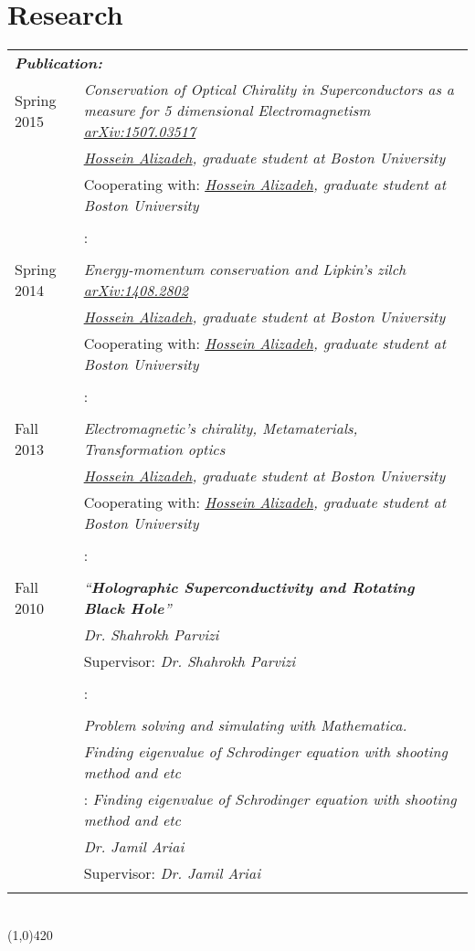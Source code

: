 \documentclass[10pt]{article}
\newcommand\HRule{\hspace*{.8cm}\line(1,0){420}\\}
\newenvironment{Record}[1]
{
    \vspace{-0.35cm}
    \section*{#1}
        \vspace{0.1cm}
        \begin{tabular}
}
{
        \end{tabular}\\
        \HRule
}
\begin{document}
\newcommand{\Research}[7]{
    \multicolumn{2}{l}{\textbf{\textsl{ #1:}}}\\
    \quad#2&\textit{#3}\\
    \ifthenelse{\isempty{#4}}
    {&\textit{#5}\\}
    {&#4: \textit{#5}\\}
    \ifthenelse{\isempty{#6}}
    {&\textit{#7}\\}
    {&#6: \textit{#7}\\}%
}

\begin{Record}{Research}{l p{11cm}}
    \Research{Publication}
        {Spring 2015}
        {Conservation of Optical Chirality in Superconductors as a measure for 5 dimensional Electromagnetism \href{http://arxiv.org/abs/1507.03517}{arXiv:1507.03517}}
        {Cooperating with}
        {\href{http://physics.bu.edu/people/show/halizade}{Hossein Alizadeh}, graduate student at Boston University}
        {}{}%
    \Research{Publication}
        {Spring 2014}
        {Energy-momentum conservation and Lipkin’s zilch \href{http://arxiv.org/abs/1408.2802}{arXiv:1408.2802}}
        {Cooperating with}
        {\href{http://physics.bu.edu/people/show/halizade}{Hossein Alizadeh}, graduate student at Boston University}
        {}{}%
    \Research{Independent Research}
        {Fall 2013}
        {Electromagnetic's chirality, Metamaterials, Transformation optics}
        {Cooperating with}
        {\href{http://physics.bu.edu/people/show/halizade}{Hossein Alizadeh}, graduate student at Boston University}
        {}{}%
    \Research{M.Sc thesis}
        {Fall 2010}
        {``\textbf{Holographic Superconductivity and Rotating Black Hole}''}
        {Supervisor}
        {Dr. Shahrokh Parvizi}
        {}{}%
    \Research{B.Sc projects}
        {}
        {Problem solving and simulating with Mathematica.}
        {}
        {Finding eigenvalue of Schrodinger equation with shooting method and etc}
        {Supervisor}
        {Dr. Jamil Ariai}%

\end{Record}


\newcommand{\Reference}[5]{
    \multicolumn{2}{l}{\textbf{\textsl{ #1}}}\\
    \quad#2&\textit{#3}\\
    &\textit{#4}\\
    &\textit{#5}\\
}
\end{document}
